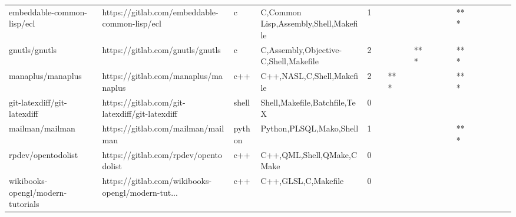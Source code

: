 \begin{tabular}{llllrlllllllllllll}
embeddable-common-lisp/ecl                         &      https://gitlab.com/embeddable-common-lisp/ecl &                 c &              C,Common Lisp,Assembly,Shell,Makefile &       1 &         &        &           &                &                 &        &           &       *** &          &          &       &              &          \\
gnutls/gnutls                                      &                   https://gitlab.com/gnutls/gnutls &                 c &              C,Assembly,Objective-C,Shell,Makefile &       2 &         &        &           &            *** &                 &        &           &       *** &          &          &       &              &          \\
manaplus/manaplus                                  &               https://gitlab.com/manaplus/manaplus &               c++ &                          C++,NASL,C,Shell,Makefile &       2 &         &    *** &           &                &                 &        &           &       *** &          &          &       &              &          \\
git-latexdiff/git-latexdiff                        &     https://gitlab.com/git-latexdiff/git-latexdiff &             shell &                       Shell,Makefile,Batchfile,TeX &       0 &         &        &           &                &                 &        &           &           &          &          &       &              &          \\
mailman/mailman                                    &                 https://gitlab.com/mailman/mailman &            python &                            Python,PLSQL,Mako,Shell &       1 &         &        &           &                &                 &        &           &       *** &          &          &       &              &          \\
rpdev/opentodolist                                 &              https://gitlab.com/rpdev/opentodolist &               c++ &                          C++,QML,Shell,QMake,CMake &       0 &         &        &           &                &                 &        &           &           &          &          &       &              &          \\
wikibooks-opengl/modern-tutorials                  &  https://gitlab.com/wikibooks-opengl/modern-tut... &               c++ &                                C++,GLSL,C,Makefile &       0 &         &        &           &                &                 &        &           &           &          &          &       &              &          \\

\end{tabular}
